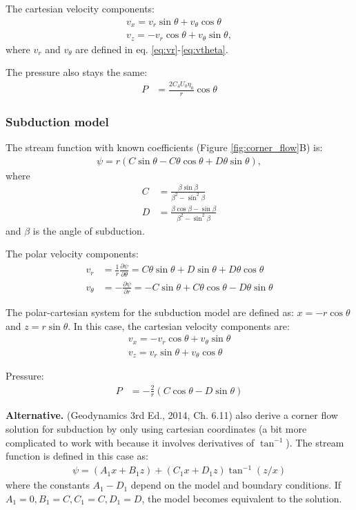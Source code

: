 \documentclass[a4paper,11pt]{article}
\begin{document}
The cartesian velocity components:
\begin{align}
v_x = v_r\sin\theta + v_\theta\cos\theta\\
v_z = -v_r\cos\theta + v_\theta\sin\theta,
\end{align}
where $v_r$ and $v_\theta$ are defined in eq. \ref{eq:vr}-\ref{eq:vtheta}. 

The pressure also stays the same:
\begin{align}
P &= \frac{2C_4 U_0 \eta_0}{r}\cos\theta
\end{align}

\subsubsection{Subduction model}

The stream function with known coefficients \citep{Spiegelman1987} (Figure \ref{fig:corner_flow}B) is:
\begin{align}
\psi = r (C\sin\theta-C\theta\cos\theta+D\theta\sin\theta),
\end{align}
where
\begin{align}
C&=\frac{\displaystyle \beta\sin\beta}{\displaystyle \beta^2-\sin^2\beta} \\
D&=\frac{\displaystyle \beta\cos\beta-\sin\beta}{\displaystyle \beta^2-\sin^2\beta}
\end{align}
and $\beta$ is the angle of subduction.

The polar velocity components:
\begin{align}
 v_r&= \frac{1}{r}\frac{\partial\psi}{\partial\theta} = C\theta\sin\theta+D\sin\theta+D\theta\cos\theta\\
v_\theta&=-\frac{\partial\psi}{\partial r} = -C\sin\theta+C\theta\cos\theta-D\theta\sin\theta
 \end{align}
 
The polar-cartesian system for the subduction model are defined as: $x=-r\cos\theta$ and $z=r\sin\theta$. In this case, the cartesian velocity components are:
\begin{align}
v_x = -v_r\cos\theta + v_\theta\sin\theta\\
v_z = v_r\sin\theta + v_\theta\cos\theta
\end{align}

Pressure:
\begin{align}
P &= -\frac{2}{r}\left(C\cos\theta-D\sin\theta\right)
\end{align}

\textbf{Alternative.} \citet{Turcotte2014} (Geodynamics 3rd Ed., 2014, Ch. 6.11) also derive a corner flow solution for subduction by only using cartesian coordinates (a bit more complicated to work with because it involves derivatives of $\tan^{-1}$). The stream function is defined in this case as:
\begin{align}
\psi = (A_1x+B_1z)+(C_1x+D_1z)\tan^{-1}(z/x)
\end{align}
where the constants $A_1-D_1$ depend on the model and boundary conditions. If $A_1=0, B_1=C, C_1=C, D_1=D$, the model becomes equivalent to the \citet{Spiegelman1987} solution.
\end{document}
